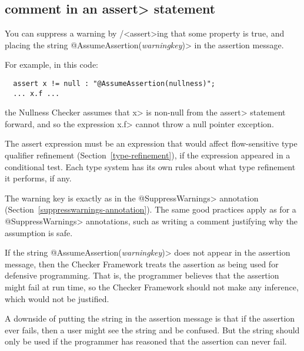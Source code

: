 \subsection{ comment in an \<assert> statement\label{assumeassertion}}

You can suppress a warning by /<assert>ing that some property is true, and
placing the string \<@AssumeAssertion(\emph{warningkey})> in the assertion
message.

For example, in this code:

\begin{Verbatim}
  assert x != null : "@AssumeAssertion(nullness)";
  ... x.f ...
\end{Verbatim}

\noindent
the Nullness Checker assumes that \<x> is non-null from the \<assert>
statement forward, and so the expression \<x.f> cannot throw a null pointer
exception.

The assert expression must be an expression that would affect flow-sensitive
type qualifier refinement (Section~\ref{type-refinement}), if the
expression appeared in a conditional test.  Each type system has its own
rules about what type refinement it performs, if any.

The warning key is exactly as in the \<@SuppressWarnings> annotation
(Section~\ref{suppresswarnings-annotation}).  The same good practices apply
as for a \<@SuppressWarnings> annotations, such as writing a comment
justifying why the assumption is safe.

If the string \<@AssumeAssertion(\emph{warningkey})> does not appear in the
assertion message, then the Checker Framework treats the assertion as
being used for defensive programming.  That is, the programmer believes
that the assertion might fail at run time, so the Checker Framework should
not make any inference, which would not be justified.

A downside of putting the string in the assertion message is that if the
assertion ever fails, then a user might see the string and be confused.
But the string should only be used if the programmer has reasoned that the
assertion can never fail.



